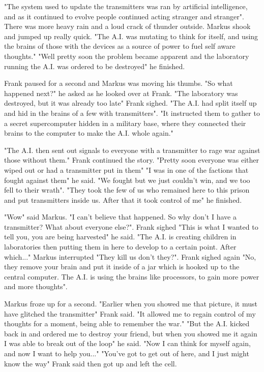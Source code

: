 \documentclass[12pt]{book}
\begin{document}
"The system used to update the transmitters was ran by artificial intelligence, and as it continued to evolve people continued acting stranger and stranger". There was more heavy rain and a loud crack of thunder outside. Markus shook and jumped up really quick. "The A.I. was mutating to think for itself, and using the brains of those with the devices as a source of power to fuel self aware thoughts." "Well pretty soon the problem became apparent and the laboratory running the A.I. was ordered to be destroyed" he finished.

Frank paused for a second and Markus was moving his thumbs. "So what happened next?" he asked as he looked over at Frank. "The laboratory was destroyed, but it was already too late" Frank sighed. "The A.I. had split itself up and hid in the brains of a few with transmitters". "It instructed them to gather to a secret supercomputer hidden in a military base, where they connected their brains to the computer to make the A.I. whole again."

"The A.I. then sent out signals to everyone with a transmitter to rage war against those without them." Frank continued the story. "Pretty soon everyone was either wiped out or had a transmitter put in them" "I was in one of the factions that fought against them" he said. "We fought but we just couldn't win, and we too fell to their wrath". "They took the few of us who remained here to this prison and put transmitters inside us. After that it took control of me" he finished.

"Wow" said Markus. "I can't believe that happened. So why don't I have a transmitter? What about everyone else?". Frank sighed "This is what I wanted to tell you, you are being harvested" he said. "The A.I. is creating children in laboratories then putting them in here to develop to a certain point. After which..." Markus interrupted "They kill us don't they?". Frank sighed again "No, they remove your brain and put it inside of a jar which is hooked up to the central computer. The A.I. is using the brains like processors, to gain more power and more thoughts".

Markus froze up for a second. "Earlier when you showed me that picture, it must have glitched the transmitter" Frank said. "It allowed me to regain control of my thoughts for a moment, being able to remember the war." "But the A.I. kicked back in and ordered me to destroy your friend, but when you showed me it again I was able to break out of the loop" he said. "Now I can think for myself again, and now I want to help you..." "You've got to get out of here, and I just might know the way" Frank said then got up and left the cell.
\end{document}
